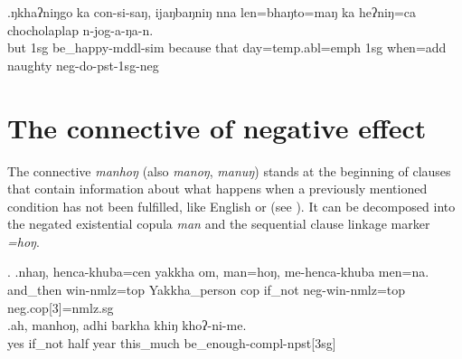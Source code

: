 \exg.ŋkhaʔniŋgo ka  con-si-saŋ,   ijaŋbaŋniŋ   nna  len=bhaŋto=maŋ      ka  heʔniŋ=ca        chocholaplap n-jog-a-ŋa-n.\\
	but {\sc 1sg}   be\_happy{\sc -mddl-sim} because that day{\sc =temp.abl=emph} {\sc 1sg} when{\sc =add} naughty {\sc neg-}do{\sc -pst-1sg-neg} \\
	 

\section{The connective of negative effect}

The connective \emph{manhoŋ} (also \emph{manoŋ}, \emph{manuŋ}) stands at the beginning of clauses that contain information about what happens when a previously mentioned condition has not been fulfilled, like English  or  (see \Next). It can be decomposed into the  negated existential copula \emph{man} and the sequential clause linkage marker \emph{=hoŋ}.

\ex. \ag.nhaŋ,    henca-khuba=cen               yakkha          om, man=hoŋ, me-henca-khuba               men=na.\\
and\_then win{\sc -nmlz=top} Yakkha\_person {\sc cop} if\_not {\sc neg-}win{\sc -nmlz=top} {\sc neg.cop[3]=nmlz.sg}\\
 
\bg.ah,    manhoŋ,  adhi barkha khiŋ     khoʔ-ni-me.\\
yes if\_not half year this\_much be\_enough{\sc -compl-npst[3sg]}\\
 



